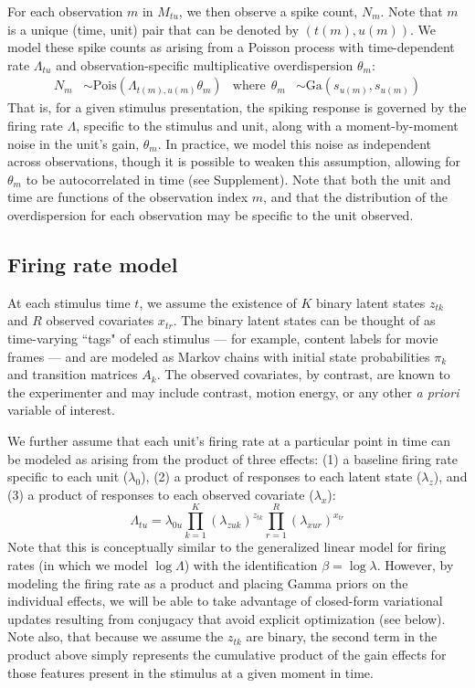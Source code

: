 \documentclass[10pt,letterpaper]{article}
\begin{document}
For each observation $m$ in $M_{tu}$, we then observe a spike count, $N_m$. Note that $m$ is a unique (time, unit) pair that can be denoted by $(t(m), u(m))$. We model these spike counts as arising from a Poisson process with time-dependent rate $\Lambda_{tu}$ and observation-specific multiplicative overdispersion $\theta_m$:
\begin{align}
    \label{obs_model}
    N_{m} &\sim \text{Pois}(\Lambda_{t(m), u(m)} \theta_m) &
    \text{where} ~~ \theta_m &\sim \text{Ga}(s_{u(m)}, s_{u(m)})
\end{align}
That is, for a given stimulus presentation, the spiking response is governed by the firing rate $\Lambda$, specific to the stimulus and unit, along with a moment-by-moment noise in the unit's gain, $\theta_m$. In practice, we model this noise as independent across observations, though it is possible to weaken this assumption, allowing for $\theta_m$ to be autocorrelated in time (see Supplement). Note that both the unit and time are functions of the observation index $m$, and that the distribution of the overdispersion for each observation may be specific to the unit observed.

\subsection*{Firing rate model}
At each stimulus time $t$, we assume the existence of $K$ binary latent states $z_{tk}$ and $R$ observed covariates $x_{tr}$. The binary latent states can be thought of as time-varying ``tags" of each stimulus --- for example, content labels for movie frames --- and are modeled as Markov chains with initial state probabilities $\pi_k$ and transition matrices $A_k$. The observed covariates, by contrast, are known to the experimenter and may include contrast, motion energy, or any other \emph{a priori} variable of interest.

We further assume that each unit's firing rate at a particular point in time can be modeled as arising from the product of three effects: (1) a baseline firing rate specific to each unit ($\lambda_0$), (2) a product of responses to each latent state ($\lambda_z$), and (3) a product of responses to each observed covariate ($\lambda_x$):
\begin{equation}
    \label{fr_model}
    \Lambda_{tu} = \lambda_{0u} \prod_{k = 1}^K (\lambda_{zuk})^{z_{tk}}
    \prod_{r = 1}^R (\lambda_{xur})^{x_{tr}}
\end{equation}
Note that this is conceptually similar to the generalized linear model for firing rates (in which we model $\log \Lambda$) with the identification $\beta = \log \lambda$. However, by modeling the firing rate as a product and placing Gamma priors on the individual effects, we will be able to take advantage of closed-form variational updates resulting from conjugacy that avoid explicit optimization (see below). Note also, that because we assume the $z_{tk}$ are binary, the second term in the product above simply represents the cumulative product of the gain effects for those features present in the stimulus at a given moment in time.
\end{document}
